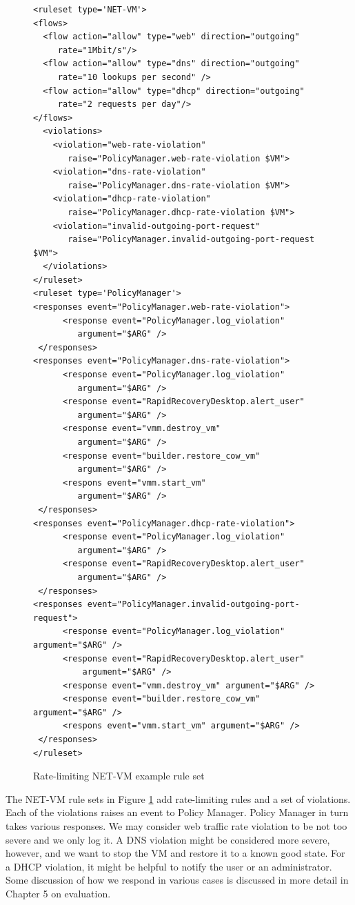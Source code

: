 \begin{figure}[tbp]
\caption{Rate-limiting NET-VM example rule set}
\label{lst:net_vm-rate}

\begin{lstlisting}
<ruleset type='NET-VM'>
<flows>
  <flow action="allow" type="web" direction="outgoing" 
     rate="1Mbit/s"/>
  <flow action="allow" type="dns" direction="outgoing" 
     rate="10 lookups per second" />
  <flow action="allow" type="dhcp" direction="outgoing" 
     rate="2 requests per day"/>
</flows>
  <violations>
    <violation="web-rate-violation" 
       raise="PolicyManager.web-rate-violation $VM">
    <violation="dns-rate-violation" 
       raise="PolicyManager.dns-rate-violation $VM">
    <violation="dhcp-rate-violation" 
       raise="PolicyManager.dhcp-rate-violation $VM">
    <violation="invalid-outgoing-port-request" 
       raise="PolicyManager.invalid-outgoing-port-request $VM">
  </violations>
</ruleset>
<ruleset type='PolicyManager'>
<responses event="PolicyManager.web-rate-violation">
      <response event="PolicyManager.log_violation" 
         argument="$ARG" />
 </responses>
<responses event="PolicyManager.dns-rate-violation">
      <response event="PolicyManager.log_violation" 
         argument="$ARG" />
      <response event="RapidRecoveryDesktop.alert_user" 
         argument="$ARG" />      
      <response event="vmm.destroy_vm" 
         argument="$ARG" />
      <response event="builder.restore_cow_vm" 
         argument="$ARG" />
      <respons event="vmm.start_vm" 
         argument="$ARG" />
 </responses>
<responses event="PolicyManager.dhcp-rate-violation">
      <response event="PolicyManager.log_violation" 
         argument="$ARG" />
      <response event="RapidRecoveryDesktop.alert_user" 
         argument="$ARG" />      
 </responses>
<responses event="PolicyManager.invalid-outgoing-port-request">
      <response event="PolicyManager.log_violation" argument="$ARG" />
      <response event="RapidRecoveryDesktop.alert_user" 
          argument="$ARG" />      
      <response event="vmm.destroy_vm" argument="$ARG" />
      <response event="builder.restore_cow_vm" argument="$ARG" />
      <respons event="vmm.start_vm" argument="$ARG" />
 </responses>
</ruleset>
\end{lstlisting}
\end{figure}

The NET-VM rule sets in Figure \ref{lst:net_vm-rate} add rate-limiting rules and a set of violations. Each of the violations raises an event to Policy Manager. Policy Manager in turn takes various responses. We may consider web traffic rate violation to be not too severe and we only log it. A DNS violation might be considered more severe, however, and we want to stop the VM and restore it to a known good state. For a DHCP violation, it might be helpful to notify the user or an administrator. Some discussion of how we respond in various cases is discussed in more detail in Chapter 5 on evaluation. 

